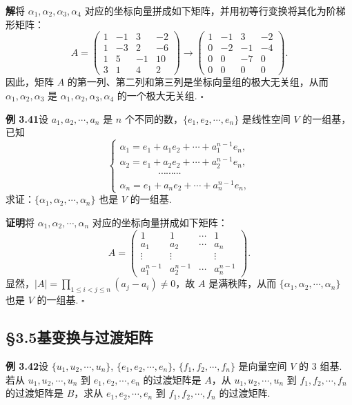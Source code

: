 \documentclass[UTF8,12pt,a4paper,fontset=fandol]{ctexart}
\begin{document}
\noindent\textbf{解}\quad 将 $\alpha_1,\alpha_2,\alpha_3,\alpha_4$ 对应的坐标向量拼成如下矩阵，并用初等行变换将其化为阶梯形矩阵：
\[
A=
\begin{pmatrix}
1 & -1 & 3 & -2\\
1 & -3 & 2 & -6\\
1 & 5 & -1 & 10\\
3 & 1 & 4 & 2
\end{pmatrix}
\to
\begin{pmatrix}
1 & -1 & 3 & -2\\
0 & -2 & -1 & -4\\
0 & 0 & -7 & 0\\
0 & 0 & 0 & 0
\end{pmatrix}.
\]
因此，矩阵 $A$ 的第一列、第二列和第三列是坐标向量组的极大无关组，从而 $\alpha_1,\alpha_2,\alpha_3$ 是 $\alpha_1,\alpha_2,\alpha_3,\alpha_4$ 的一个极大无关组. $\square$

\noindent\textbf{例 3.41}\quad 设 $a_1,a_2,\cdots,a_n$ 是 $n$ 个不同的数，$\{e_1,e_2,\cdots,e_n\}$ 是线性空间 $V$ 的一组基，已知
\[
\left\{
\begin{array}{l}
\alpha_1=e_1+a_1e_2+\cdots+a_1^{n-1}e_n,\\
\alpha_2=e_1+a_2e_2+\cdots+a_2^{n-1}e_n,\\
\hspace{4em}\cdots\cdots\cdots\\
\alpha_n=e_1+a_ne_2+\cdots+a_n^{n-1}e_n,
\end{array}
\right.
\]
求证：$\{\alpha_1,\alpha_2,\cdots,\alpha_n\}$ 也是 $V$ 的一组基.

\noindent\textbf{证明}\quad 将 $\alpha_1,\alpha_2,\cdots,\alpha_n$ 对应的坐标向量拼成如下矩阵：
\[
A=
\begin{pmatrix}
1 & 1 & \cdots & 1\\
a_1 & a_2 & \cdots & a_n\\
\vdots & \vdots &        & \vdots\\
a_1^{n-1} & a_2^{n-1} & \cdots & a_n^{n-1}
\end{pmatrix}.
\]
显然，$|A|=\prod_{1\le i<j\le n}(a_j-a_i)\ne 0$，故 $A$ 是满秩阵，从而 $\{\alpha_1,\alpha_2,\cdots,\alpha_n\}$ 也是 $V$ 的一组基. $\square$

\subsection*{§3.5\quad 基变换与过渡矩阵}

\noindent\textbf{例 3.42}\quad 设 $\{u_1,u_2,\cdots,u_n\}$, $\{e_1,e_2,\cdots,e_n\}$, $\{f_1,f_2,\cdots,f_n\}$ 是向量空间 $V$ 的 3 组基. 若从 $u_1,u_2,\cdots,u_n$ 到 $e_1,e_2,\cdots,e_n$ 的过渡矩阵是 $A$，从 $u_1,u_2,\cdots,u_n$ 到 $f_1,f_2,\cdots,f_n$ 的过渡矩阵是 $B$，求从 $e_1,e_2,\cdots,e_n$ 到 $f_1,f_2,\cdots,f_n$ 的过渡矩阵.
\end{document}
